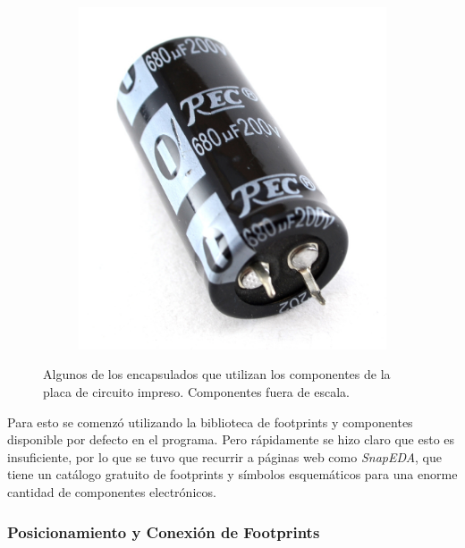 \begin{figure}[h]
    \hspace{1em}
    \begin{subfigure}
        \centering
        \includegraphics[scale=0.18]{Imagenes/Capacitor Blindado.jpg}
    \end{subfigure}
    \caption{Algunos de los encapsulados que utilizan los componentes de la placa de circuito impreso. Componentes fuera de escala.}
    \label{fig:encapsulados}
\end{figure}

Para esto se comenzó utilizando la biblioteca de footprints y componentes disponible por defecto en el programa. Pero rápidamente se hizo claro que esto es insuficiente, por lo que se tuvo que recurrir a páginas web como \textit{SnapEDA}, que tiene un catálogo gratuito de footprints y símbolos esquemáticos para una enorme cantidad de componentes electrónicos.\\

\subsubsection{Posicionamiento y Conexión de Footprints}
 

